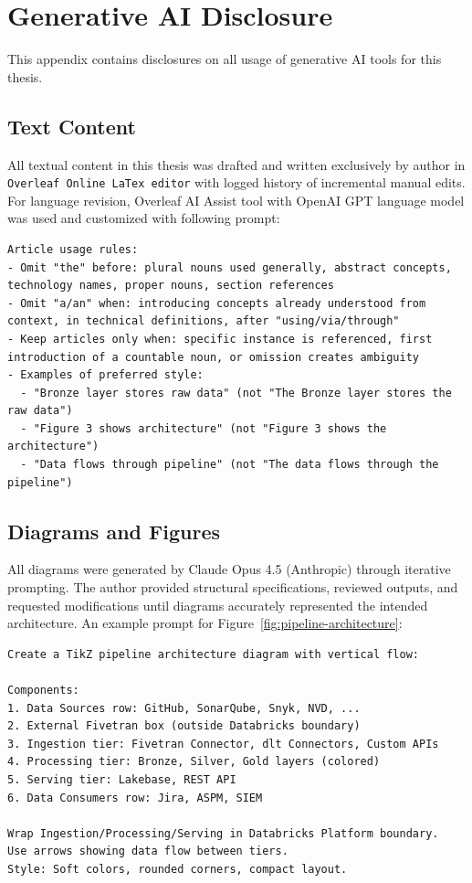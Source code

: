 \chapter{Generative AI Disclosure}
\label{app:genai}

This appendix contains disclosures on all usage of generative AI tools for this thesis.

\section*{Text Content}

All textual content in this thesis was drafted and written exclusively by author in \texttt{Overleaf Online LaTex editor} with logged history of incremental manual edits. For language revision, Overleaf AI Assist tool with OpenAI GPT language model was used and customized with following prompt:

\begin{lstlisting}[frame=single, backgroundcolor=\color{backcolour}, rulecolor=\color{framecolour}, basicstyle=\small\ttfamily, breaklines=true]
Article usage rules:
- Omit "the" before: plural nouns used generally, abstract concepts, technology names, proper nouns, section references
- Omit "a/an" when: introducing concepts already understood from context, in technical definitions, after "using/via/through"
- Keep articles only when: specific instance is referenced, first introduction of a countable noun, or omission creates ambiguity
- Examples of preferred style:
  - "Bronze layer stores raw data" (not "The Bronze layer stores the raw data")
  - "Figure 3 shows architecture" (not "Figure 3 shows the architecture")
  - "Data flows through pipeline" (not "The data flows through the pipeline")
\end{lstlisting}

\section*{Diagrams and Figures}

All \TikZ{} diagrams were generated by Claude Opus 4.5 (Anthropic) through iterative prompting. The author provided structural specifications, reviewed outputs, and requested modifications until diagrams accurately represented the intended architecture. An example prompt for Figure~\ref{fig:pipeline-architecture}:

\begin{lstlisting}[frame=single, backgroundcolor=\color{backcolour}, rulecolor=\color{framecolour}, basicstyle=\small\ttfamily, breaklines=true]
Create a TikZ pipeline architecture diagram with vertical flow:

Components:
1. Data Sources row: GitHub, SonarQube, Snyk, NVD, ...
2. External Fivetran box (outside Databricks boundary)
3. Ingestion tier: Fivetran Connector, dlt Connectors, Custom APIs
4. Processing tier: Bronze, Silver, Gold layers (colored)
5. Serving tier: Lakebase, REST API
6. Data Consumers row: Jira, ASPM, SIEM

Wrap Ingestion/Processing/Serving in Databricks Platform boundary.
Use arrows showing data flow between tiers.
Style: Soft colors, rounded corners, compact layout.
\end{lstlisting}

